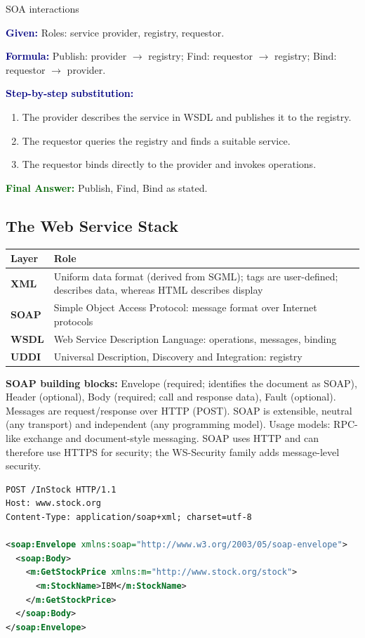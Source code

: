 \documentclass[11pt,a4paper,openany]{report}
\newcommand{\Given}{\par\textbf{\textcolor{navy}{Given:}} }
\newcommand{\Formula}{\par\textbf{\textcolor{navy}{Formula:}} }
\newcommand{\Steps}{\par\textbf{\textcolor{navy}{Step-by-step substitution:}}\par}
\newcommand{\Answer}{\par\textbf{\textcolor{darkgreen}{Final Answer:}} }
\begin{document}
\begin{solved}{SOA interactions}
\Given Roles: service provider, registry, requestor.
\Formula Publish: provider $\to$ registry; Find: requestor $\to$ registry; Bind: requestor $\to$ provider.
\Steps
\begin{enumerate}[leftmargin=*]
  \item The provider describes the service in WSDL and publishes it to the registry.
  \item The requestor queries the registry and finds a suitable service.
  \item The requestor binds directly to the provider and invokes operations.
\end{enumerate}
\Answer Publish, Find, Bind as stated.
\end{solved}

\subsection{The Web Service Stack}
\begin{center}
\begin{tabularx}{\textwidth}{>{\bfseries}lX}
\toprule
Layer & Role\\
\midrule
XML & Uniform data format (derived from SGML); tags are user-defined; describes data, whereas HTML describes
display\\
SOAP & Simple Object Access Protocol: message format over Internet protocols\\
WSDL & Web Service Description Language: operations, messages, binding\\
UDDI & Universal Description, Discovery and Integration: registry\\
\bottomrule
\end{tabularx}
\end{center}

\textbf{SOAP building blocks:} Envelope (required; identifies the document as SOAP), Header (optional), Body (required;
call and response data), Fault (optional). Messages are request/response over HTTP (POST). SOAP is extensible, neutral
(any transport) and independent (any programming model). Usage models: RPC-like exchange and document-style messaging.
SOAP uses HTTP and can therefore use HTTPS for security; the WS-Security family adds message-level security.

\begin{lstlisting}[language=XML]
POST /InStock HTTP/1.1
Host: www.stock.org
Content-Type: application/soap+xml; charset=utf-8

<soap:Envelope xmlns:soap="http://www.w3.org/2003/05/soap-envelope">
  <soap:Body>
    <m:GetStockPrice xmlns:m="http://www.stock.org/stock">
      <m:StockName>IBM</m:StockName>
    </m:GetStockPrice>
  </soap:Body>
</soap:Envelope>
\end{lstlisting}
\end{document}
